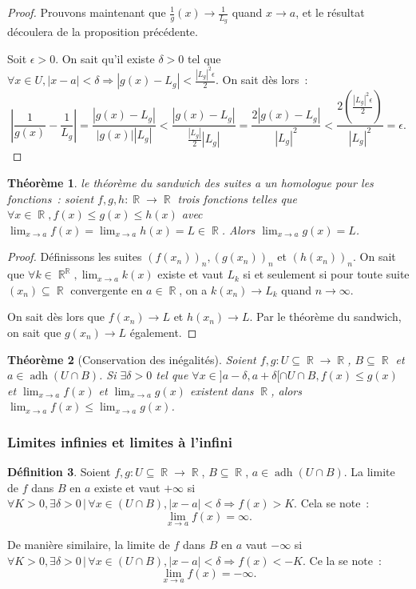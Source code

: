 \documentclass{article}
\DeclareMathOperator{\R}{\mathbb R}
\DeclareMathOperator{\adh}{adh}
\newtheorem{thm}{Théorème}[section]
\theoremstyle{definition}
\newtheorem{déf}[thm]{Définition}
\theoremstyle{remark}
\begin{document}
\begin{proof}
			Prouvons maintenant que $\frac 1g(x) \to \frac 1{L_g}$ quand $x \to a$, et le résultat découlera de la proposition précédente.

			Soit $\epsilon > 0$. On sait qu'il existe $\delta > 0$ tel que $\forall x \in U, |x-a| < \delta \Rightarrow |g(x) - L_g| < \frac {|L_g|^2\epsilon}2$.
			On sait dès lors~:
			\[\left|\frac 1{g(x)} - \frac 1{L_g}\right| = \frac {|g(x)-L_g|}{|g(x)||L_g|} < \frac {|g(x)-L_g|}{\frac {|L_g|}{2}|L_g|}
			  = \frac {2|g(x)-L_g|}{|L_g|^2} < \frac {2(\frac {|L_g|^2\epsilon}{2})}{|L_g|^2} = \epsilon.\]

			\end{proof}

			\begin{thm} le théorème du sandwich des suites a un homologue pour les fonctions~: soient $f, g, h : \R \to \R$ trois fonctions telles que
			$\forall x \in \R, f(x) \leq g(x) \leq h(x)$ avec $\lim_{x \to a}f(x) = \lim_{x \to a}h(x) = L \in \R$. Alors $\lim_{x \to a}g(x) = L$.
			\end{thm}

			\begin{proof} Définissons les suites $(f(x_n))_n, (g(x_n))_n$ et $(h(x_n))_n$. On sait que $\forall k \in {\R}^{\R}, \lim_{x \to a}k(x)$ existe
			et vaut $L_k$ si et seulement si pour toute suite $(x_n) \subseteq \R$ convergente en $a \in \R$, on a $k(x_n) \to L_k$ quand $n \to \infty$.

			On sait dès lors que $f(x_n) \to L$ et $h(x_n) \to L$. Par le théorème du sandwich, on sait que $g(x_n) \to L$ également. \end{proof}

			\begin{thm}[Conservation des inégalités] Soient $f, g : U \subseteq \R \to \R$, $B \subseteq \R$ et $a \in \adh(U \cap B)$.
			Si $\exists \delta > 0$ tel que $\forall x \in ]a-\delta, a+\delta[ \cap U \cap B, f(x) \leq g(x)$ et $\lim_{x \to a}f(x)$ et $\lim_{x \to a}g(x)$
			existent dans $\R$, alors $\lim_{x \to a}f(x) \leq \lim_{x \to a}g(x)$. \end{thm}

		\subsubsection{Limites infinies et limites à l'infini}

			\begin{déf} Soient $f, g : U \subseteq \R \to \R$, $B \subseteq \R$, $a \in \adh(U \cap B)$. La limite de $f$ dans $B$ en $a$ existe et vaut
			$+\infty$ si $\forall K > 0, \exists \delta > 0 \, | \, \forall x \in (U \cap B), |x-a| < \delta \Rightarrow f(x) > K$. Cela se note~:
			\[\lim_{x \to a}f(x) = \infty.\]

			De manière similaire, la limite de $f$ dans $B$ en $a$ vaut $-\infty$ si $\forall K > 0, \exists \delta > 0 \, | \, \forall x \in (U \cap B), |x-a| <
			\delta \Rightarrow f(x) < -K$.
			Ce la se note~:
			\[\lim_{x \to a}f(x) = -\infty.\]
			\end{déf}
\end{document}

